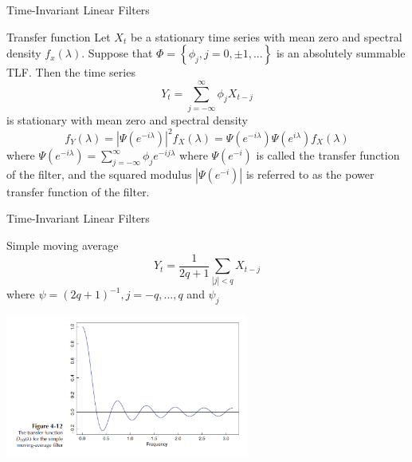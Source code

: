\documentclass[11pt]{beamer}
\begin{document}
\begin{frame}{Time-Invariant Linear Filters \cite{brockwell2002introduction}}
\begin{alertblock}{Transfer function}
Let ${X_{t}}$ be a stationary time series with mean zero and spectral density $f_{x}(\lambda)$. Suppose that $\Phi=\left\lbrace \phi_{j},j=0,\pm 1,... \right\rbrace$ is an absolutely summable TLF. Then the time series 
\begin{equation*}
Y_{t}=\sum_{j=-\infty}^{\infty}\phi_{j}X_{t-j}
\end{equation*}
is stationary with mean zero and spectral density 
\begin{equation*}
f_{Y}(\lambda)=|\Psi(e^{-i\lambda})|^{2}f_{X}(\lambda)=\Psi(e^{-i\lambda})\Psi(e^{i\lambda})f_{X}(\lambda)
\end{equation*}
where $\Psi(e^{-i\lambda})=\sum^{\infty}_{j=-\infty}\phi_{j}e^{-ij\lambda}$ where  $\Psi(e^{-i})$ is called the transfer function of the filter, and the squared modulus $|\Psi(e^{-i})|$ is referred to as the power transfer function of the filter. 
\end{alertblock}
\end{frame}

\begin{frame}{Time-Invariant Linear Filters \cite{brockwell2002introduction}}
\begin{exampleblock}{Simple moving average}
\begin{equation*}
Y_{t}=\dfrac{1}{2q+1}\sum_{|j|<q}X_{t-j}
\end{equation*}
where $\psi=(2q+1)^{-1},j=-q,...,q$ and $\psi_{j}$
\end{exampleblock}
    \begin{center}
     \includegraphics[width=0.6\textwidth]{Pic/D_MA.png}
    \end{center}
\end{frame}
\end{document}
